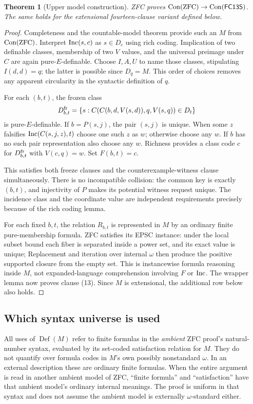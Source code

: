 \documentclass[11pt]{article}
\newtheorem{theorem}{Theorem}
\newcommand{\Inc}{\mathop{\rm Inc}}
\newcommand{\Con}{\mathop{\rm Con}}
\newcommand{\FC}{\ensuremath{\mathsf{FC13S}}}
\begin{document}
\begin{theorem}[Upper model construction]
ZFC proves $\Con(\mathrm{ZFC})\to\Con(\FC)$.  The same holds for the
extensional fourteen-clause variant defined below.
\end{theorem}
\begin{proof}
Completeness and the countable-model theorem provide such an $M$ from
$\Con(\mathrm{ZFC})$.  Interpret $\Inc(s,c)$ as $s\in D_c$ using rich
coding.  Implication of two definable classes, membership of two $V$
values, and the universal preimage under $C$ are again pure-$E$-definable.
Choose $I,A,U$ to name those classes, stipulating $I(d,d)=q$; the latter
is possible since $D_q=M$.  This order of choices removes any apparent
circularity in the syntactic definition of $q$.

For each $(b,t)$, the frozen class
\[
 D^{\rm fr}_{b,t}=\{s:C(C(b,d,V(s,d)),q,V(s,q))\in D_t\}
\]
is pure-$E$-definable.  If $b=P(s,j)$, the pair $(s,j)$ is unique.  When
some $z$ falsifies $\Inc(C(s,j,z),t)$ choose one such $z$ as $w$;
otherwise choose any $w$.  If $b$ has no such pair representation also
choose any $w$.  Richness provides a class code $c$ for $D^{\rm fr}_{b,t}$
with $V(c,q)=w$.  Set $F(b,t)=c$.

This satisfies both freeze clauses and the counterexample-witness clause
simultaneously.  There is no incompatible collision: the common key is
exactly $(b,t)$, and injectivity of $P$ makes its potential witness request
unique.  The incidence class and the coordinate value are independent
requirements precisely because of the rich coding lemma.

For each fixed $b,t$, the relation $R_{b,t}$ is represented in $M$ by an
ordinary finite pure-membership formula.  ZFC satisfies its EPSC instance:
under the local subset bound each fiber is separated inside a power set,
and its exact value is unique; Replacement and iteration over internal
$\omega$ then produce the positive supported closure from the empty set.
This is instancewise formula reasoning inside $M$, not expanded-language
comprehension involving $F$ or $\Inc$.  The wrapper lemma now proves
clause (13).  Since $M$ is extensional, the additional row below also holds.
\end{proof}

\subsection*{Which syntax universe is used}

All uses of $\operatorname{Def}(M)$ refer to finite formulas in the
\emph{ambient} ZFC proof's natural-number syntax, evaluated by its
set-coded satisfaction relation for $M$.  They do not quantify over
formula codes in $M$'s own possibly nonstandard $\omega$.  In an external
description these are ordinary finite formulas.  When the entire argument
is read in another ambient model of ZFC, ``finite formula'' and
``satisfaction'' have that ambient model's ordinary internal meanings.
The proof is uniform in that syntax and does not assume the ambient
model is externally $\omega$-standard either.
\end{document}
